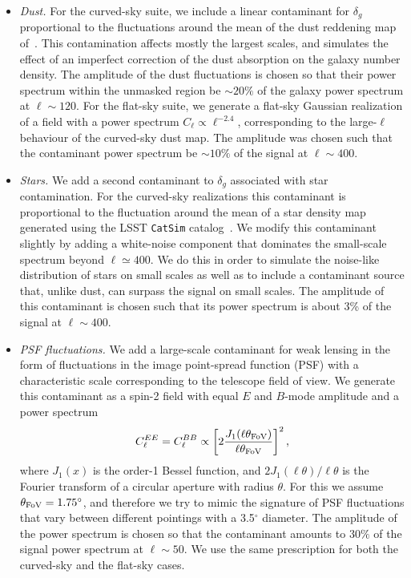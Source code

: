 \documentclass[usenatbib]{mnrasb}
\begin{document}
\begin{itemize}
          \begin{itemize}
            \item {\sl Dust.} For the curved-sky suite, we include a linear contaminant for $\delta_g$ proportional to the fluctuations around the mean of the dust reddening map of~\citet{1998wfsc.conf..297S}. This contamination affects mostly the largest scales, and simulates the effect of an imperfect correction of the dust absorption on the galaxy number density. The amplitude of the dust fluctuations is chosen so that their power spectrum within the unmasked region be $\sim20\%$ of the galaxy power spectrum at $\ell\sim120$. For the flat-sky suite, we generate a flat-sky Gaussian realization of a field with a power spectrum $C_\ell\propto\ell^{-2.4}$, corresponding to the large-$\ell$ behaviour of the curved-sky dust map. The amplitude was chosen such that the contaminant power spectrum be $\sim10\%$ of the signal at $\ell\sim400$.
            \item {\sl Stars.} We add a second contaminant to $\delta_g$ associated with star contamination. For the curved-sky realizations this contaminant is proportional to the fluctuation around the mean of a star density map generated using the LSST {\tt CatSim} catalog~\citep{2014SPIE.9150E..14C}. We modify this contaminant slightly by adding a white-noise component that dominates the small-scale spectrum beyond $\ell\simeq400$. We do this in order to simulate the noise-like distribution of stars on small scales as well as to include a contaminant source that, unlike dust, can surpass the signal on small scales. The amplitude of this contaminant is chosen such that its power spectrum is about 3\% of the signal at $\ell\sim400$.
            \item {\sl PSF fluctuations.} We add a large-scale contaminant for weak lensing in the form of fluctuations in the image point-spread function (PSF) with a characteristic scale corresponding to the telescope field of view. We generate this contaminant as a spin-2 field with equal $E$ and $B$-mode amplitude and a power spectrum
            \begin{equation}
              C^{EE}_\ell=C^{BB}_\ell\propto\left[2\frac{J_1(\ell\theta_{\rm FoV})}{\ell\theta_{\rm FoV}}\right]^2,
            \end{equation}
            where $J_1(x)$ is the order-1 Bessel function, and $2J_1(\ell\theta)/\ell\theta$ is the Fourier transform of a circular aperture with radius $\theta$. For this we assume $\theta_{\rm FoV}=1.75^\circ$, and therefore we try to mimic the signature of PSF fluctuations that vary between different pointings with a 3.5$^\circ$ diameter. The amplitude of the power spectrum is chosen so that the contaminant amounts to $30\%$ of the signal power spectrum at $\ell\sim50$. We use the same prescription for both the curved-sky and the flat-sky cases. 

\end{itemize}
\end{itemize}
\end{document}
